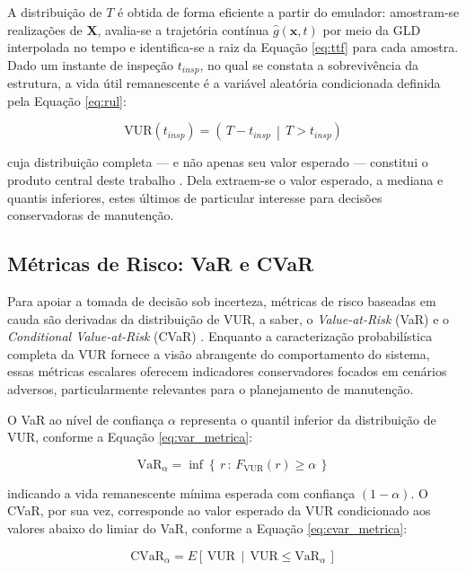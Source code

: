 A distribuição de $T$ é obtida de forma eficiente a partir do emulador: amostram-se realizações de $\mathbf{X}$, avalia-se a trajetória contínua $\hat{g}(\mathbf{x}, t)$ por meio da GLD interpolada no tempo e identifica-se a raiz da Equação \eqref{eq:ttf} para cada amostra. Dado um instante de inspeção $t_{insp}$, no qual se constata a sobrevivência da estrutura, a vida útil remanescente é a variável aleatória condicionada definida pela Equação \eqref{eq:rul}:

\begin{equation}\label{eq:rul}
\mathrm{VUR}(t_{insp}) = \left(\, T - t_{insp} \,\middle|\, T > t_{insp} \right)
\end{equation}

cuja distribuição completa --- e não apenas seu valor esperado --- constitui o produto central deste trabalho \cite{si2011}. Dela extraem-se o valor esperado, a mediana e quantis inferiores, estes últimos de particular interesse para decisões conservadoras de manutenção.

\subsection{Métricas de Risco: VaR e CVaR}

Para apoiar a tomada de decisão sob incerteza, métricas de risco baseadas em cauda são derivadas da distribuição de VUR, a saber, o \textit{Value-at-Risk} (VaR) e o \textit{Conditional Value-at-Risk} (CVaR) \cite{rockafellar2000}. Enquanto a caracterização probabilística completa da VUR fornece a visão abrangente do comportamento do sistema, essas métricas escalares oferecem indicadores conservadores focados em cenários adversos, particularmente relevantes para o planejamento de manutenção.

O VaR ao nível de confiança $\alpha$ representa o quantil inferior da distribuição de VUR, conforme a Equação \eqref{eq:var_metrica}:

\begin{equation}\label{eq:var_metrica}
\mathrm{VaR}_\alpha = \inf\left\{\, r \,:\, F_{\mathrm{VUR}}(r) \geq \alpha \,\right\}
\end{equation}

indicando a vida remanescente mínima esperada com confiança $(1-\alpha)$. O CVaR, por sua vez, corresponde ao valor esperado da VUR condicionado aos valores abaixo do limiar do VaR, conforme a Equação \eqref{eq:cvar_metrica}:

\begin{equation}\label{eq:cvar_metrica}
\mathrm{CVaR}_\alpha = E\left[\, \mathrm{VUR} \,\middle|\, \mathrm{VUR} \leq \mathrm{VaR}_\alpha \,\right]
\end{equation}

